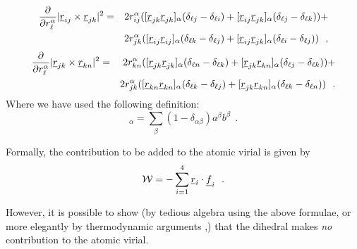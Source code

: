 \begin{eqnarray}
\frac{\partial}{\partial r_{\ell}^{\alpha}}
|\mbox{$\underline{r}$}_{ij}\times\mbox{$\underline{r}$}_{jk}|^{2}&=&
2r_{ij}^{\alpha}([\mbox{$\underline{r}$}_{jk}\mbox{$\underline{r}$}_{jk}]_{\alpha}(\delta_{\ell j}-\delta_{\ell i})+
[\mbox{$\underline{r}$}_{ij}\mbox{$\underline{r}$}_{jk}]_{\alpha}(\delta_{\ell j}-\delta_{\ell k}))+\nonumber \\
& & 2r_{jk}^{\alpha}([\mbox{$\underline{r}$}_{ij}\mbox{$\underline{r}$}_{ij}]_{\alpha}
(\delta_{\ell k}-\delta_{\ell j}) +[\mbox{$\underline{r}$}_{ij}\mbox{$\underline{r}$}_{jk}]_{\alpha}
(\delta_{\ell i}-\delta_{\ell j}))~~,
\end{eqnarray}
\begin{eqnarray}
\frac{\partial}{\partial r_{\ell}^{\alpha}}
|\mbox{$\underline{r}$}_{jk}\times\mbox{$\underline{r}$}_{kn}|^{2}&=&
2r_{kn}^{\alpha}([\mbox{$\underline{r}$}_{jk}\mbox{$\underline{r}$}_{jk}]_{\alpha}(\delta_{\ell n}-\delta_{\ell k})+
[\mbox{$\underline{r}$}_{jk}\mbox{$\underline{r}$}_{kn}]_{\alpha}(\delta_{\ell j}-\delta_{\ell k}))+\nonumber \\
& & 2r_{jk}^{\alpha}([\mbox{$\underline{r}$}_{kn}\mbox{$\underline{r}$}_{kn}]_{\alpha}
(\delta_{\ell k}-\delta_{\ell j})+
[\mbox{$\underline{r}$}_{jk}\mbox{$\underline{r}$}_{kn}]_{\alpha}(\delta_{\ell k}-\delta_{\ell n}))~~.
\end{eqnarray}
Where we have used the following definition:
\begin{equation}
[\vek{a}~\vek{b}]_{\alpha} =
\sum_{\beta}(1-\delta_{\alpha\beta})a^{\beta}b^{\beta}~~.
\end{equation}

Formally, the contribution to be added to the atomic virial is given
by
\begin{equation}
{\cal W}=-\sum_{i=1}^{4} \mbox{$\underline{r}$}_{i} \cdot \mbox{$\underline{f}$}_{i}~~.
\end{equation}

However, it is possible to show (by tedious algebra using the
above formulae, or more elegantly by thermodynamic arguments
\cite{smith-93c},) that the dihedral makes {\em no} contribution
to the atomic virial.

